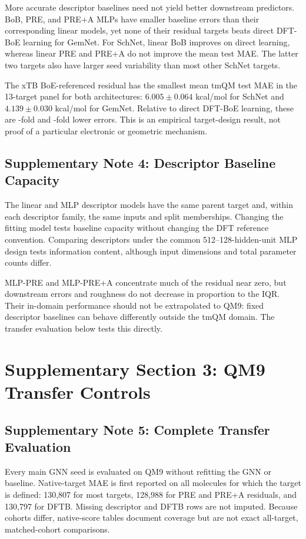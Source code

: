 More accurate descriptor baselines need not yield better downstream predictors. BoB, PRE, and PRE+A MLPs have smaller baseline errors than their corresponding linear models, yet none of their residual targets beats direct DFT-BoE learning for GemNet. For SchNet, linear BoB improves on direct learning, whereas linear PRE and PRE+A do not improve the mean test MAE. The latter two targets also have larger seed variability than most other SchNet targets.

The xTB BoE-referenced residual has the smallest mean tmQM test MAE in the 13-target panel for both architectures: \(6.005\pm0.064\) kcal/mol for SchNet and \(4.139\pm0.030\) kcal/mol for GemNet. Relative to direct DFT-BoE learning, these are -fold and -fold lower errors. This is an empirical target-design result, not proof of a particular electronic or geometric mechanism.

\subsection*{Supplementary Note 4: Descriptor Baseline Capacity}
The linear and MLP descriptor models have the same parent target and, within each descriptor family, the same inputs and split memberships. Changing the fitting model tests baseline capacity without changing the DFT reference convention. Comparing descriptors under the common 512--128-hidden-unit MLP design tests information content, although input dimensions and total parameter counts differ.

MLP-PRE and MLP-PRE+A concentrate much of the residual near zero, but downstream errors and roughness do not decrease in proportion to the IQR. Their in-domain performance should not be extrapolated to QM9: fixed descriptor baselines can behave differently outside the tmQM domain. The transfer evaluation below tests this directly.

\clearpage
\section*{Supplementary Section 3: QM9 Transfer Controls}
\subsection*{Supplementary Note 5: Complete Transfer Evaluation}
Every main GNN seed is evaluated on QM9 without refitting the GNN or baseline. Native-target MAE is first reported on all molecules for which the target is defined: 130,807 for most targets, 128,988 for PRE and PRE+A residuals, and 130,797 for DFTB. Missing descriptor and DFTB rows are not imputed. Because cohorts differ, native-score tables document coverage but are not exact all-target, matched-cohort comparisons.

